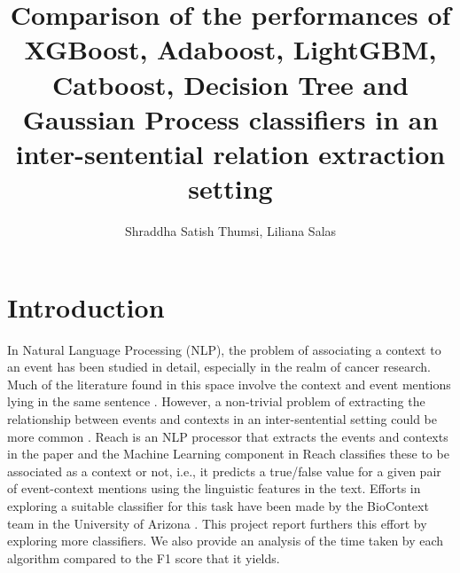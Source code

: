\documentclass[10pt]{article}
\begin{document}
\title{Comparison of the performances of XGBoost, Adaboost, LightGBM, Catboost, Decision Tree and Gaussian Process classifiers in an inter-sentential relation extraction setting}
\author{Shraddha Satish Thumsi, Liliana Salas}
\maketitle




\section{Introduction}

In Natural Language Processing (NLP), the problem of associating a context to an event has been studied in detail, especially in the realm of cancer research. Much of the literature found in this space involve the context and event mentions lying in the same sentence \cite{relation_extraction_review}. However, a non-trivial problem of extracting the relationship between events and contexts in an inter-sentential setting could be more common \cite{inter_sentential_RE}.
Reach is an NLP processor that extracts the events and contexts in the paper and the Machine Learning component in Reach classifies these to be associated as a context or not, i.e., it predicts a true/false value for a given pair of event-context mentions using the linguistic features in the text. Efforts in exploring a suitable classifier for this task have been made by the BioContext team in the University of Arizona \cite{context_assoc_paper}. This project report furthers this effort by exploring more classifiers. We also provide an analysis of the time taken by each algorithm compared to the F1 score that it yields.
\end{document}

